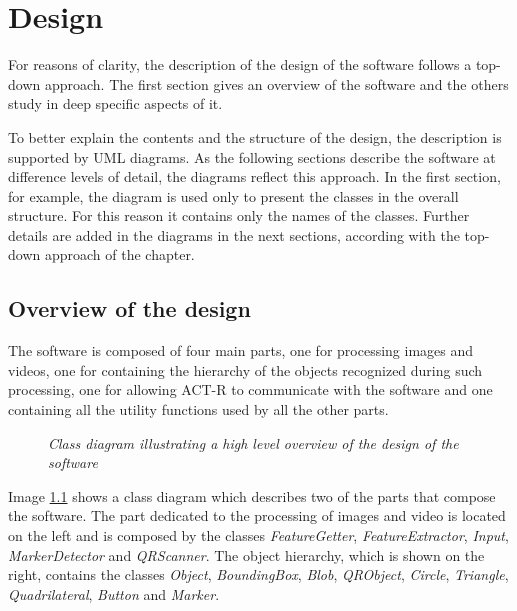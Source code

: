 \chapter{Design}
	For reasons of clarity, the description of the design of the software follows a top-down approach. The first section gives an overview of the software and the others study in deep specific aspects of it.

	To better explain the contents and the structure of the design, the description is supported by \mbox{UML} diagrams. As the following sections describe the software at difference levels of detail, the diagrams reflect this approach. In the first section, for example, the diagram is used only to present the classes in the overall structure. For this reason it contains only the names of the classes. Further details are added in the diagrams in the next sections, according with the top-down approach of the chapter.

	\section{Overview of the design}
	The software is composed of four main parts, one for processing images and videos, one for containing the hierarchy of the objects recognized during such processing, one for allowing ACT-R to communicate with the software and one containing all the utility functions used by all the other parts.

	\begin{figure}[h]
	  \begin{center} 
	  \end{center} 
	  \caption{\textit{Class diagram illustrating a high level overview of the design of the software }}  
	  \label{fig:swArchitecture}
 	\end{figure}		

	Image \ref{fig:swArchitecture} shows a class diagram which describes two of the parts that compose the software. 
	The part dedicated to the processing of images and video is located on the left and is composed by the classes \emph{FeatureGetter}, \emph{FeatureExtractor}, \emph{Input}, \emph{MarkerDetector} and \emph{QRScanner}.
	The object hierarchy, which is shown on the right, contains the classes \emph{Object}, \emph{BoundingBox}, \emph{Blob}, \emph{QRObject}, \emph{Circle}, \emph{Triangle}, \emph{Quadrilateral}, \emph{Button} and \emph{Marker}.

